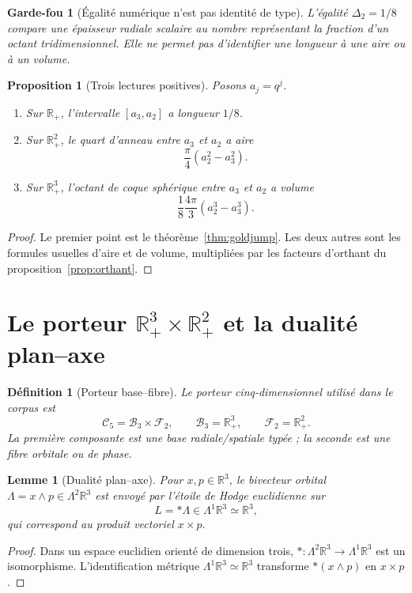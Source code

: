 \documentclass[11pt,a4paper]{article}
\newtheorem{proposition}[theorem]{Proposition}
\newtheorem{lemma}[theorem]{Lemme}
\newtheorem{definition}[theorem]{Définition}
\newtheorem{guardrail}[theorem]{Garde-fou}
\newcommand{\R}{\mathbb R}
\newcommand{\Rp}{\mathbb R_{+}}
\begin{document}
\begin{guardrail}[Égalité numérique n'est pas identité de type]
L'égalité $\Delta_2=1/8$ compare une épaisseur radiale scalaire au nombre représentant la fraction d'un octant tridimensionnel. Elle ne permet pas d'identifier une longueur à une aire ou à un volume.
\end{guardrail}

\begin{proposition}[Trois lectures positives]
Posons $a_j=q^j$.
\begin{enumerate}[label=\textup{(\roman*)}]
\item Sur $\Rp$, l'intervalle $[a_3,a_2]$ a longueur $1/8$.
\item Sur $\Rp^2$, le quart d'anneau entre $a_3$ et $a_2$ a aire
\[
 \frac{\pi}{4}(a_2^2-a_3^2).
\]
\item Sur $\Rp^3$, l'octant de coque sphérique entre $a_3$ et $a_2$ a volume
\[
 \frac18\frac{4\pi}{3}(a_2^3-a_3^3).
\]
\end{enumerate}
\end{proposition}

\begin{proof}
Le premier point est le théorème~\ref{thm:goldjump}. Les deux autres sont les formules usuelles d'aire et de volume, multipliées par les facteurs d'orthant du proposition~\ref{prop:orthant}.
\end{proof}

\section{Le porteur $\Rp^3\times\Rp^2$ et la dualité plan--axe}

\begin{definition}[Porteur base--fibre]
Le porteur cinq-dimensionnel utilisé dans le corpus est
\[
 \mathcal C_5=\mathcal B_3\times\mathcal F_2,
 \qquad
 \mathcal B_3=\Rp^3,
 \qquad
 \mathcal F_2=\Rp^2.
\]
La première composante est une base radiale/spatiale typée ; la seconde est une fibre orbitale ou de phase.
\end{definition}

\begin{lemma}[Dualité plan--axe]
Pour $x,p\in\R^3$, le bivecteur orbital $\Lambda=x\wedge p\in\Lambda^2\R^3$ est envoyé par l'étoile de Hodge euclidienne sur
\[
 L=*\Lambda\in\Lambda^1\R^3\simeq\R^3,
\]
qui correspond au produit vectoriel $x\times p$.
\end{lemma}

\begin{proof}
Dans un espace euclidien orienté de dimension trois, $*: \Lambda^2\R^3\to\Lambda^1\R^3$ est un isomorphisme. L'identification métrique $\Lambda^1\R^3\simeq\R^3$ transforme $*(x\wedge p)$ en $x\times p$.
\end{proof}
\end{document}

